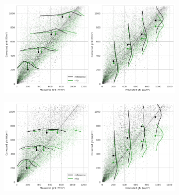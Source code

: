 \begin{figure}[htb!]
    \centering
    \begin{subfigure}{\columnwidth}
        \includegraphics[width=\columnwidth]{figures/first_study/scatter_plot_mlp_site1_rmse.png}
    \end{subfigure}
\medskip
    \begin{subfigure}{\columnwidth}
        \includegraphics[width=\columnwidth]{figures/first_study/scatter_plot_mlp_site2_rmse.png}
    \end{subfigure}
\medskip


\end{figure}
